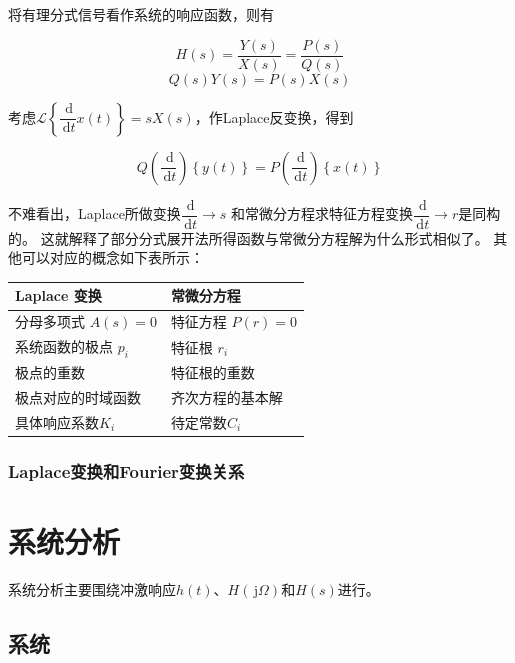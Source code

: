 \documentclass[UTF8,fontset=fandol,zihao=5]{ctexart}
\newcommand{\jj}{\,\mathrm{j}}
\newcommand{\dd}{\,\mathrm{d}}
\newcommand{\LL}{\mathcal{L}}
\begin{document}
\begin{methodbox}[【理解】复常微分方程与部分分式展开法]
  将有理分式信号看作系统的响应函数，则有
  
  \[
  H(s)=\frac{Y(s)}{X(s)}=\frac{P(s)}{Q(s)}
  \]
  \[
  Q(s)Y(s)=P(s)X(s)
  \]

  考虑$\LL\left\{\dfrac{\dd}{\dd t}x(t)\right\}=sX(s)$，作Laplace反变换，得到
  
  \[
  Q\left(\frac{\dd}{\dd t}\right)\left\{y(t)\right\}=P\left(\frac{\dd}{\dd t}\right)\left\{x(t)\right\}
  \]

  不难看出，Laplace所做变换$\dfrac{\dd}{\dd t} \longrightarrow s$
  和常微分方程求特征方程变换$\dfrac{\dd}{\dd t}\longrightarrow r$是同构的。
  这就解释了部分分式展开法所得函数与常微分方程解为什么形式相似了。
  其他可以对应的概念如下表所示：

  \begin{center}
    \centering
    \begin{tabularx}{\textwidth}{
    @{}
    >{\centering\arraybackslash}X
    >{\centering\arraybackslash}X@{}
    }
      \toprule
      Laplace 变换 & 常微分方程 \\
      \midrule
      分母多项式 $A(s)=0$ & 特征方程 $P(r)=0$ \\
      系统函数的极点 $p_i$ & 特征根 $r_i$ \\
      极点的重数 & 特征根的重数 \\
      极点对应的时域函数 & 齐次方程的基本解 \\
      具体响应系数$K_i$ & 待定常数$C_i$ \\
      \bottomrule
    \end{tabularx}
  \end{center}
\end{methodbox}

\subsubsection{Laplace变换和Fourier变换关系}

\section{系统分析}

系统分析主要围绕冲激响应$h(t)$、$H(\jj \varOmega)$和$H(s)$进行。

\subsection{系统}
\end{document}
